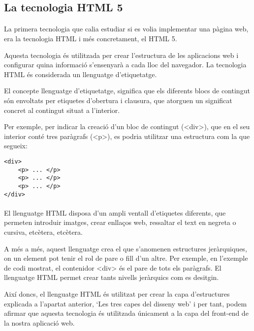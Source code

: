 \subsection{La tecnologia HTML 5}

    \paragraph{}
    La primera tecnologia que calia estudiar si es volia implementar una pàgina web, era la tecnologia HTML i més concretament, el HTML 5.

    Aquesta tecnologia és utilitzada per crear l’estructura de les aplicacions web i configurar quina informació s’ensenyarà a cada lloc del navegador. La tecnologia HTML és considerada un llenguatge d’etiquetatge.

    El concepte llenguatge d'etiquetatge, significa que els diferents blocs de contingut són envoltats per etiquetes d'obertura i clausura, que atorguen un significat concret al contingut situat a l'interior.

    Per exemple, per indicar la creació d’un bloc de contingut (<div>), que en el seu interior conté tres paràgrafs (<p>), es podria utilitzar una estructura com la que segueix:

    \begin{lstlisting}[style=rawOwn,caption={Bloc de contingunts HTML amb tres paràgrafs}]
<div>
    <p> ... </p>
    <p> ... </p>
    <p> ... </p>
</div>
    \end{lstlisting}

    \paragraph{}
    El llenguatge HTML disposa d’un ampli ventall d’etiquetes diferents, que permeten introduir imatges, crear enllaços web, ressaltar el text en negreta o cursiva, etcètera, etcètera.

    A més a més, aquest llenguatge crea el que s’anomenen estructures jeràrquiques, on un element pot tenir el rol de pare o fill d’un altre. Per exemple, en l’exemple de codi mostrat, el contenidor <div> és el pare de tots els paràgrafs. El llenguatge HTML permet crear tants nivells jeràrquics com es desitgin.

    Així doncs, el llenguatge HTML és utilitzat per crear la capa d'estructures explicada a l'apartat anterior, `Les tres capes del disseny web' i per tant, podem afirmar que aquesta tecnologia és utilitzada únicament a la capa del front-end de la nostra aplicació web.
